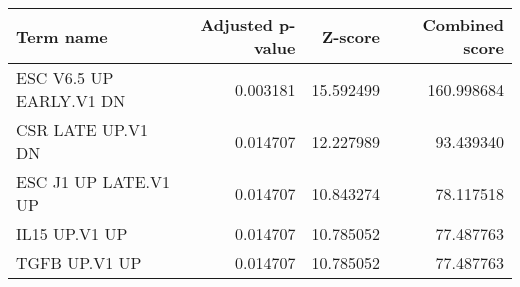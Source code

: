 \begin{tabular}{lrrr}
\toprule
              Term name &  Adjusted p-value &   Z-score &  Combined score \\
\midrule
ESC V6.5 UP EARLY.V1 DN &          0.003181 & 15.592499 &      160.998684 \\
      CSR LATE UP.V1 DN &          0.014707 & 12.227989 &       93.439340 \\
   ESC J1 UP LATE.V1 UP &          0.014707 & 10.843274 &       78.117518 \\
          IL15 UP.V1 UP &          0.014707 & 10.785052 &       77.487763 \\
          TGFB UP.V1 UP &          0.014707 & 10.785052 &       77.487763 \\
\bottomrule
\end{tabular}
